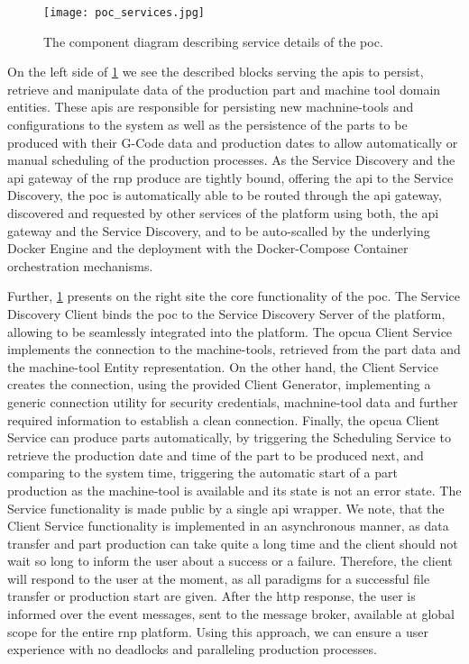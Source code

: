 \documentclass[
a4paper,
twoside,
headsepline,
cleardoublepage=empty,
parskip=half,
draft=false
]{scrbook}
\begin{document}
				\begin{figure}[htbp]
					\centering
					\texttt{[image: poc\_services.jpg]}
					\caption{The component diagram describing service details of the \gls{poc}.}
					\label{fig:poc_service_diagram}
				\end{figure}

				On the left side of \cref{fig:poc_service_diagram} we see the described blocks serving the \gls{api}s to persist, retrieve and manipulate data of the production part and machine tool domain entities. These \gls{api}s are responsible for persisting new machnine-tools and configurations to the system as well as the persistence of the parts to be produced with their G-Code data and production dates to allow automatically or manual scheduling of the production processes. As the Service Discovery and the \gls{api} gateway of the \gls{rnp} produce are tightly bound, offering the \gls{api} to the Service Discovery, the \gls{poc} is automatically able to be routed through the \gls{api} gateway, discovered and requested by other services of the platform using both, the \gls{api} gateway and the Service Discovery, and to be auto-scalled by the underlying Docker Engine and the deployment with the Docker-Compose Container orchestration mechanisms.

				Further, \cref{fig:poc_service_diagram} presents on the right site the core functionality of the \gls{poc}.
				The Service Discovery Client binds the \gls{poc} to the Service Discovery Server of the platform, allowing to be seamlessly integrated into the platform.
				The \gls{opcua} Client Service implements the connection to the machine-tools, retrieved from the part data and the machine-tool Entity representation.
				On the other hand, the Client Service creates the connection, using the provided Client Generator, implementing a generic connection utility for security credentials, machnine-tool data and further required information to establish a clean connection. Finally, the \gls{opcua} Client Service can produce parts automatically, by triggering the Scheduling Service to retrieve the production date and time of the part to be produced next, and comparing to the system time, triggering the automatic start of a part production as the machine-tool is available and its state is not an error state.
				The Service functionality is made public by a single \gls{api} wrapper.
				We note, that the Client Service functionality is implemented in an asynchronous manner, as data transfer and part production can take quite a long time and the client should not wait so long to inform the user about a success or a failure. Therefore, the client will respond to the user at the moment, as all paradigms for a successful file transfer or production start are given. After the \gls{http} response, the user is informed over the event messages, sent to the message broker, available at global scope for the entire \gls{rnp} platform. Using this approach, we can ensure a user experience with no deadlocks and paralleling production processes.
\end{document}

